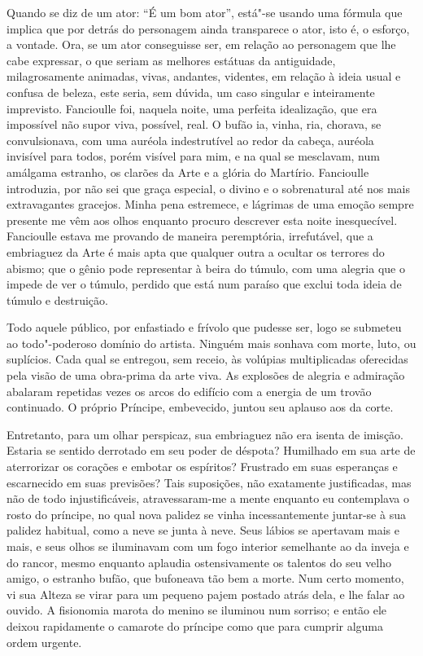 Quando se diz de um ator: “É um bom ator'',
está"-se usando uma fórmula que implica que por detrás do personagem
ainda transparece o ator, isto é, o esforço, a vontade. Ora, se um ator
conseguisse ser, em relação ao personagem que lhe cabe expressar,
o que seriam as melhores estátuas da antiguidade, milagrosamente
animadas, vivas, andantes, videntes, em relação à ideia usual e
confusa de beleza, este seria, sem dúvida, um caso singular e
inteiramente imprevisto. Fancioulle foi, naquela noite, uma perfeita
idealização, que era impossível não supor viva, possível, real. O bufão
ia, vinha, ria, chorava, se convulsionava, com uma auréola indestrutível
ao redor da cabeça, auréola invisível para todos, porém visível para mim,
e na qual se mesclavam, num amálgama estranho, os clarões da Arte e a
glória do Martírio. Fancioulle introduzia, por não sei que graça
especial, o divino e o sobrenatural até nos mais extravagantes
gracejos. Minha pena estremece, e lágrimas de uma emoção sempre
presente me vêm aos olhos enquanto procuro descrever esta noite
inesquecível. Fancioulle estava me provando de maneira peremptória,
irrefutável, que a embriaguez da Arte é mais apta que qualquer
outra a ocultar os terrores do abismo; que o gênio pode representar
à beira do túmulo, com uma alegria que o impede de ver o túmulo,
perdido que está num paraíso que exclui toda ideia de túmulo e destruição.

Todo aquele público, por enfastiado e frívolo que pudesse ser, logo
se submeteu ao todo"-poderoso domínio do artista. Ninguém mais
sonhava com morte, luto, ou suplícios. Cada qual se entregou,
sem receio, às volúpias multiplicadas oferecidas pela visão de uma obra-prima 
da arte viva. As explosões de alegria e admiração abalaram
repetidas vezes os arcos do edifício com a energia de um trovão
continuado. O próprio Príncipe, embevecido, juntou seu aplauso aos da
corte.

Entretanto, para um olhar perspicaz, sua embriaguez não era isenta de
imisção. Estaria se sentido derrotado em seu poder de déspota? Humilhado em
sua arte de aterrorizar os corações e embotar os espíritos? Frustrado
em suas esperanças e escarnecido em suas previsões? Tais suposições,
não exatamente justificadas, mas não de todo injustificáveis,
atravessaram-me a mente enquanto eu contemplava o rosto do príncipe,
no qual nova palidez se vinha incessantemente juntar-se à sua palidez habitual, como
a neve se junta à neve. Seus lábios se apertavam mais e mais, e seus
olhos se iluminavam com um fogo interior semelhante ao da inveja e do
rancor, mesmo enquanto aplaudia ostensivamente os talentos do seu velho
amigo, o estranho bufão, que bufoneava tão bem a morte. Num certo
momento, vi sua Alteza se virar para um pequeno pajem postado atrás
dela, e lhe falar ao ouvido. A fisionomia marota do menino se iluminou
num sorriso; e então ele deixou rapidamente o camarote do príncipe como
que para cumprir alguma ordem urgente.

